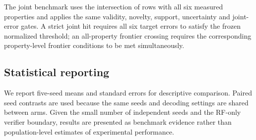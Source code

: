 The joint benchmark uses the intersection of rows with all six measured properties and applies the same validity, novelty, support, uncertainty and joint-error gates. A strict joint hit requires all six target errors to satisfy the frozen normalized threshold; an all-property frontier crossing requires the corresponding property-level frontier conditions to be met simultaneously.

\subsection*{Statistical reporting}

We report five-seed means and standard errors for descriptive comparison. Paired seed contrasts are used because the same seeds and decoding settings are shared between arms. Given the small number of independent seeds and the RF-only verifier boundary, results are presented as benchmark evidence rather than population-level estimates of experimental performance.
